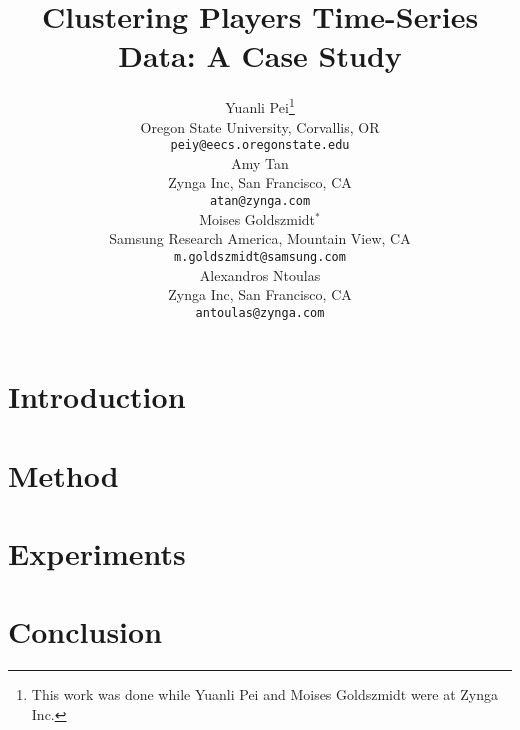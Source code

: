 \documentclass{article} %
\title{Clustering Players Time-Series Data: A Case Study}
\author{
Yuanli Pei\thanks{This work was done while Yuanli Pei and Moises Goldszmidt were at Zynga Inc.} \\
Oregon State University, Corvallis, OR\\
\texttt{peiy@eecs.oregonstate.edu} \\
\And
Amy Tan\\
Zynga Inc, San Francisco, CA\\
\texttt{atan@zynga.com} \\
\AND
Moises Goldszmidt$^\ast$ \\
Samsung Research America, Mountain View, CA \\
\texttt{m.goldszmidt@samsung.com} \\
\And
Alexandros Ntoulas\\
Zynga Inc, San Francisco, CA \\
\texttt{antoulas@zynga.com} 
}
\begin{document}
\maketitle

\begin{abstract}
%

\end{abstract}


\section{Introduction}
%


%

\section{Method}


\section{Experiments}


\section{Conclusion}




\small{
    {}
    
}



\end{document}
